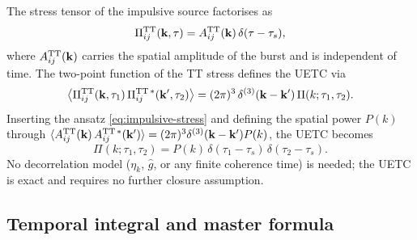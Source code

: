 \documentclass[10pt,prd,aps,nobibnotes,superscriptaddress,preprintnumbers,notitlepage]{revtex4-1}
\newcommand{\kb}{{\bf k}}
\begin{document}
The stress tensor of the impulsive source factorises as
\begin{equation}
  \Pi^{\rm TT}_{ij}(\kb,\tau) = A^{\rm TT}_{ij}(\kb)\,\delta(\tau-\tau_s),
  \label{eq:impulsive-stress}
\end{equation}
where $A^{\rm TT}_{ij}(\kb)$ carries the spatial amplitude of the burst and is
independent of time. The two-point function of the TT stress defines the UETC
via
\begin{equation}
  \bigl\langle\Pi^{\rm TT}_{ij}(\kb,\tau_1)\,
  \Pi^{\rm TT\,*}_{ij}(\kb',\tau_2)\bigr\rangle
  = (2\pi)^3\,\delta^{(3)}(\kb-\kb')\,\Pi(k;\tau_1,\tau_2).
  \label{eq:uetc-def-impulsive}
\end{equation}
Inserting the ansatz \eqref{eq:impulsive-stress} and defining the spatial power
$P(k)$ through
$\langle A^{\rm TT}_{ij}(\kb)\,A^{\rm TT\,*}_{ij}(\kb')\rangle
=(2\pi)^3\delta^{(3)}(\kb-\kb')P(k)$, the UETC becomes
\begin{equation}
  \Pi(k;\tau_1,\tau_2) = P(k)\,\delta(\tau_1-\tau_s)\,\delta(\tau_2-\tau_s).
  \label{eq:uetc-impulsive}
\end{equation}
No decorrelation model ($\eta_k$, $\hat g$, or any finite coherence time) is
needed; the UETC is exact and requires no further closure assumption.

\subsection{Temporal integral and master formula}
\label{sec:impulsive-temporal}
\end{document}
